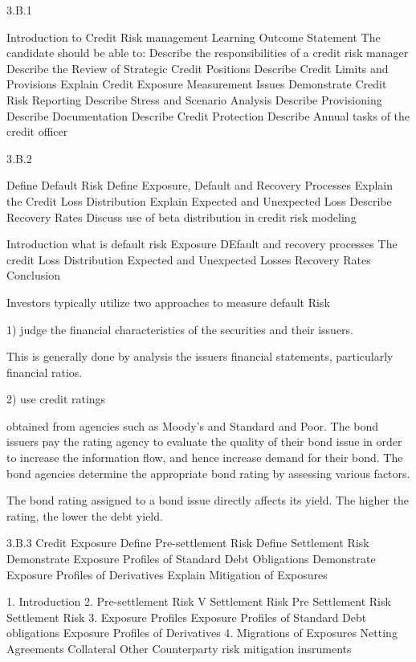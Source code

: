 
 3.B.1

Introduction to Credit Risk management
Learning Outcome Statement
The candidate should be able to:
 Describe the responsibilities of a credit risk manager
 Describe the Review of Strategic Credit Positions
 Describe Credit Limits and Provisions
 Explain Credit Exposure Measurement Issues
 Demonstrate Credit Risk Reporting
 Describe Stress and Scenario Analysis
 Describe Provisioning
 Describe Documentation
 Describe Credit Protection
 Describe Annual tasks of the credit officer

3.B.2

Define Default Risk
 Define Exposure, Default and Recovery Processes
 Explain the Credit Loss Distribution
 Explain Expected and Unexpected Loss
 Describe Recovery Rates
 Discuss use of beta distribution in credit risk modeling

Introduction
what is default risk
Exposure DEfault and recovery processes
The credit Loss Distribution
Expected and Unexpected Losses
Recovery Rates
Conclusion


Investors typically utilize two approaches to measure default Risk

1) judge the financial characteristics of the securities and their issuers.

This is generally done by analysis the issuers financial statements, particularly financial ratios.

2) use credit ratings

	obtained from agencies such as Moody's and Standard and Poor.
The bond issuers pay the rating agency to evaluate the quality of their bond issue in order to increase the information flow, and hence increase demand for their bond.
The bond agencies determine the appropriate bond rating by assessing various factors.

The bond rating assigned to a bond issue directly affects its yield. The higher the rating, the lower the debt yield.

3.B.3 Credit Exposure
 Define Pre-settlement Risk
 Define Settlement Risk
 Demonstrate Exposure Profiles of Standard Debt Obligations
 Demonstrate Exposure Profiles of Derivatives
 Explain Mitigation of Exposures

1. Introduction
2. Pre-settlement Risk V Settlement Risk
	Pre Settlement Risk
	Settlement Risk	
3. Exposure Profiles
	Exposure Profiles of Standard Debt obligations
	Exposure Profiles of Derivatives
4. Migrations of Exposures
 	Netting Agreements
	Collateral
	Other Counterparty risk mitigation insruments


